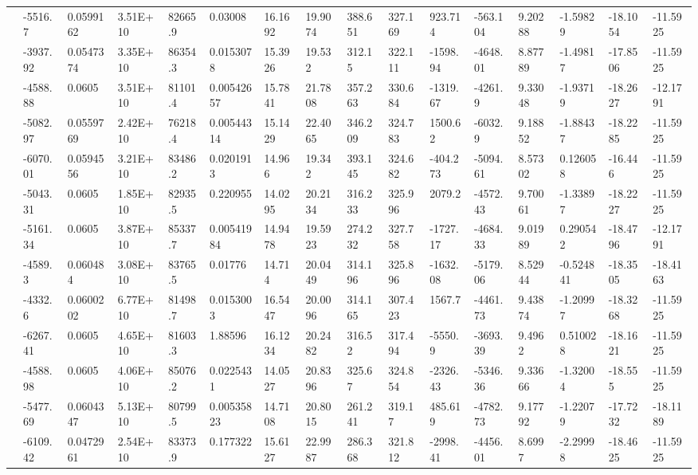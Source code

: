 \documentclass[paper=a4, fontsize=11pt]{scrartcl}
\numberwithin{equation}{section}
\numberwithin{figure}{section}
\numberwithin{table}{section}
\begin{document}
{{\begin{tabular}{l || l | l | l | l | l | l | l | l | l | l | l | l | l | l | l}
    & -5516.7 & 0.0599162 & 3.51E+10 & 82665.9 & 0.03008 & 16.1692 & 19.9074 & 388.651 & 327.169 & 923.714 & -563.104 & 9.20288 & -1.59829 & -18.1054 & -11.5925 \\
    & -3937.92 & 0.0547374 & 3.35E+10 & 86354.3 & 0.0153078 & 15.3926 & 19.532 & 312.15 & 322.111 & -1598.94 & -4648.01 & 8.87789 & -1.49817 & -17.8506 & -11.5925 \\
    & -4588.88 & 0.0605 & 3.51E+10 & 81101.4 & 0.00542657 & 15.7841 & 21.7808 & 357.263 & 330.684 & -1319.67 & -4261.9 & 9.33048 & -1.93719 & -18.2627 & -12.1791 \\
    & -5082.97 & 0.0559769 & 2.42E+10 & 76218.4 & 0.00544314 & 15.1429 & 22.4065 & 346.209 & 324.783 & 1500.62 & -6032.9 & 9.18852 & -1.88437 & -18.2285 & -11.5925 \\
    & -6070.01 & 0.0594556 & 3.21E+10 & 83486.2 & 0.0201913 & 14.966 & 19.342 & 393.145 & 324.682 & -404.273 & -5094.61 & 8.57302 & 0.126058 & -16.446 & -11.5925 \\
    & -5043.31 & 0.0605 & 1.85E+10 & 82935.5 & 0.220955 & 14.0295 & 20.2134 & 316.233 & 325.996 & 2079.2 & -4572.43 & 9.70061 & -1.33897 & -18.2227 & -11.5925 \\
    & -5161.34 & 0.0605 & 3.87E+10 & 85337.7 & 0.00541984 & 14.9478 & 19.5923 & 274.232 & 327.758 & -1727.17 & -4684.33 & 9.01989 & 0.290542 & -18.4796 & -12.1791 \\
    & -4589.3 & 0.060484 & 3.08E+10 & 83765.5 & 0.01776 & 14.714 & 20.0449 & 314.196 & 325.896 & -1632.08 & -5179.06 & 8.52944 & -0.524841 & -18.3505 & -18.4163 \\
    & -4332.6 & 0.0600202 & 6.77E+10 & 81498.7 & 0.0153003 & 16.5447 & 20.0096 & 314.165 & 307.423 & 1567.7 & -4461.73 & 9.43874 & -1.20997 & -18.3268 & -11.5925 \\
    & -6267.41 & 0.0605 & 4.65E+10 & 81603.3 & 1.88596 & 16.1234 & 20.2482 & 316.52 & 317.494 & -5550.9 & -3693.39 & 9.4962 & 0.510028 & -18.1621 & -11.5925 \\
    & -4588.98 & 0.0605 & 4.06E+10 & 85076.2 & 0.0225431 & 14.0527 & 20.8396 & 325.67 & 324.854 & -2326.43 & -5346.36 & 9.33666 & -1.32004 & -18.555 & -11.5925 \\
    & -5477.69 & 0.0604347 & 5.13E+10 & 80799.5 & 0.00535823 & 14.7108 & 20.8015 & 261.241 & 319.17 & 485.619 & -4782.73 & 9.17792 & -1.22079 & -17.7232 & -18.1189 \\
    & -6109.42 & 0.0472961 & 2.54E+10 & 83373.9 & 0.177322 & 15.6127 & 22.9987 & 286.368 & 321.812 & -2998.41 & -4456.01 & 8.6997 & -2.29998 & -18.4625 & -11.5925 \\

\end{tabular}}}
\end{document}
